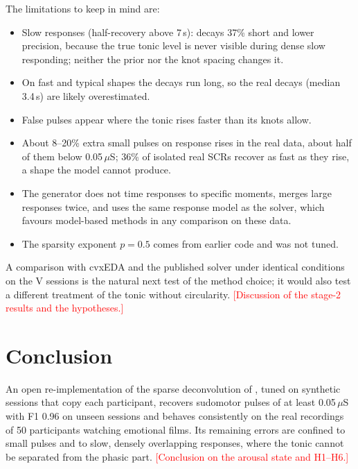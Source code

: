\documentclass[conference]{IEEEtran}
\newcommand{\uS}{\,$\mu$S}
\newcommand{\todo}[1]{\textcolor{red}{[#1]}}
\begin{document}
The limitations to keep in mind are:
\begin{itemize}
\item Slow responses (half-recovery above 7\,s): decays 37\% short and lower precision, because
the true tonic level is never visible during dense slow responding; neither the prior nor the
knot spacing changes it.
\item On fast and typical shapes the decays run long, so the real decays (median 3.4\,s) are
likely overestimated.
\item False pulses appear where the tonic rises faster than its knots allow.
\item About 8--20\% extra small pulses on response rises in the real data, about half of them
below 0.05\uS; 36\% of isolated real SCRs recover as fast as they rise, a shape the model cannot
produce.
\item The generator does not time responses to specific moments, merges large responses twice,
and uses the same response model as the solver, which favours model-based methods in any
comparison on these data.
\item The sparsity exponent $p=0.5$ comes from earlier code \cite{faghih2014} and was not tuned.
\end{itemize}

A comparison with cvxEDA \cite{greco2016} and the published solver under identical conditions on
the V sessions is the natural next test of the method choice; it would also test a different
treatment of the tonic without circularity. \todo{Discussion of the stage-2 results and the
hypotheses.}

\section{Conclusion}

An open re-implementation of the sparse deconvolution of \cite{amin2021}, tuned on synthetic
sessions that copy each participant, recovers sudomotor pulses of at least 0.05\uS{} with F1 0.96
on unseen sessions and behaves consistently on the real recordings of 50 participants watching
emotional films. Its remaining errors are confined to small pulses and to slow, densely
overlapping responses, where the tonic cannot be separated from the phasic part.
\todo{Conclusion on the arousal state and H1--H6.}



\end{document}
